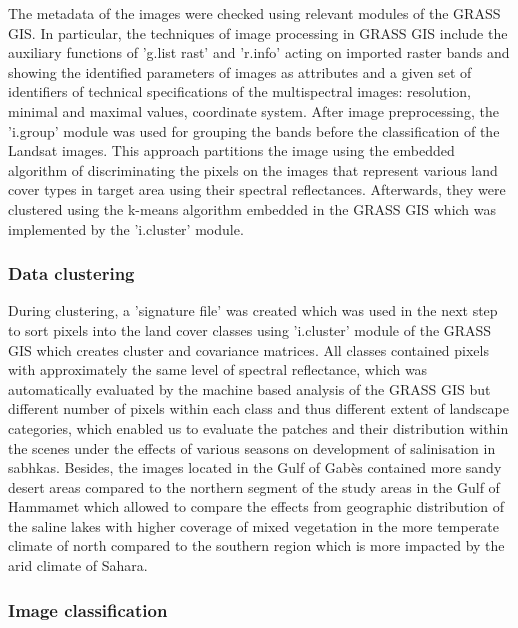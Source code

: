 \documentclass[land,article,submit,pdftex,moreauthors]{Definitions/mdpi}
\begin{document}
The metadata of the images were checked using relevant modules of the GRASS GIS. In particular, the techniques of image processing in GRASS GIS include the auxiliary functions of 'g.list rast' and 'r.info' acting on imported raster bands and showing the identified parameters of images as attributes and a given set of identifiers of technical specifications of the multispectral images: resolution, minimal and maximal values, coordinate system. After image preprocessing, the 'i.group' module was used for grouping the bands before the classification of the Landsat images. This approach partitions the image using the embedded algorithm of discriminating the pixels on the images that represent various land cover types in target area using their spectral reflectances. Afterwards, they were clustered using the k-means algorithm embedded in the GRASS GIS which was implemented by the 'i.cluster' module. 

\subsubsection{Data clustering}

During clustering, a 'signature file' was created which was used in the next step to sort pixels into the land cover classes using 'i.cluster' module of the GRASS GIS which creates cluster and covariance matrices. All classes contained pixels with approximately the same level of spectral reflectance, which was automatically evaluated by the machine based analysis of the GRASS GIS but different number of pixels within each class and thus different extent of landscape categories, which enabled us to evaluate the patches and their distribution within the scenes under the effects of various seasons on development of salinisation in sabhkas. Besides, the images located in the Gulf of Gabès contained more sandy desert areas compared to the northern segment of the study areas in the Gulf of Hammamet which allowed to compare the effects from geographic distribution of the saline lakes with higher coverage of mixed vegetation in the more temperate climate of north compared to the southern region which is more impacted by the arid climate of Sahara.

\subsubsection{Image classification}
\end{document}

